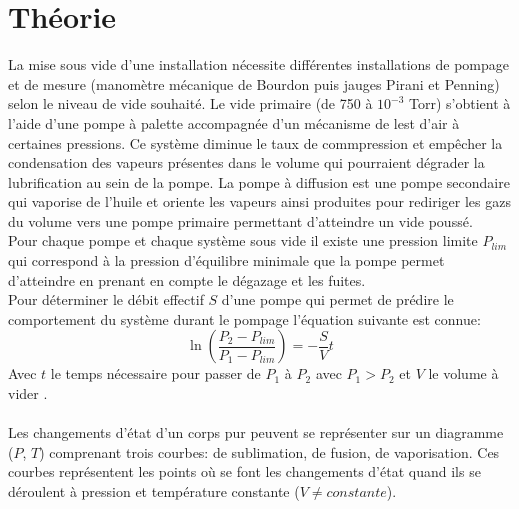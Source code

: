 \section{Théorie}



La mise sous vide d'une installation nécessite différentes installations de pompage et de mesure (manomètre mécanique de Bourdon puis jauges Pirani et Penning) selon le niveau de vide souhaité. Le vide primaire (de 750 à \(10^{-3}\) Torr) s'obtient à l'aide d'une pompe à palette accompagnée d'un mécanisme de lest d'air à certaines pressions. Ce système diminue le taux de commpression et empêcher la condensation des vapeurs présentes dans le volume qui pourraient dégrader la lubrification au sein de la pompe. La pompe à diffusion est une pompe secondaire qui vaporise de l'huile et oriente les vapeurs ainsi produites pour rediriger les gazs du volume vers une pompe primaire permettant d'atteindre un vide poussé. \\
Pour chaque pompe et chaque système sous vide il existe une pression limite \(P_{lim}\) qui correspond à la pression d'équilibre minimale que la pompe permet d'atteindre en prenant en compte le dégazage et les fuites. \\
Pour déterminer le débit effectif \(S\) d'une pompe qui permet de prédire le comportement du système durant le pompage l'équation suivante est connue:
\begin{equation}
    \ln(\frac{P_2 - P_{lim}}{P_1 - P_{lim}}) = -\frac{S}{V}t
\end{equation}
Avec \(t\) le temps nécessaire pour passer de \(P_1\) à \(P_2\) avec \(P_1 > P_2\) et \(V\) le volume à vider \cite{notice}. \\
\\
Les changements d'état d'un corps pur peuvent se représenter sur un diagramme (\(P\), \(T\)) comprenant trois courbes: de sublimation, de fusion, de vaporisation. Ces courbes représentent les points où se font les changements d'état quand ils se déroulent à pression et température constante (\(V \neq constante\)). 
